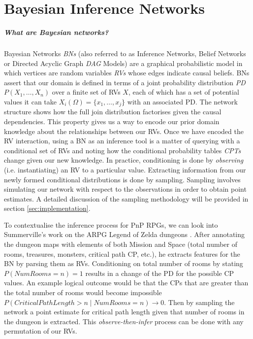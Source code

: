 \documentclass{UoYCSproject}
\begin{document}
\chapter{Bayesian Inference Networks}
\paragraph{What are Bayesian networks?}
Bayesian Networks \textit{BNs} \parencite{pearl1985bayesian} (also referred to as Inference Networks, Belief Networks or Directed Acyclic Graph \textit{DAG} Models) are a graphical probabilistic model in which vertices are random variables \textit{RVs} whose edges indicate causal beliefs. BNs assert that our domain is defined in terms of a joint probability distribution \textit{PD} \(P(X_1, \ldots , X_n)\) over a finite set of RVs \(X\), each of which has a set of potential values it can take \(X_i(\Omega) = \{x_1, \ldots, x_j\}\) with an associated PD. The network structure shows how the full join distribution factorises given the causal dependencies. This property gives us a way to encode our prior domain knowledge about the relationships between our RVs.
Once we have encoded the RV interaction, using a BN as an inference tool is a matter of querying with a conditional set of RVs and noting how the conditional probability tables \textit{CPTs} change given our new knowledge. In practice, conditioning is done by \textit{observing} (i.e. instantiating) an RV to a particular value. Extracting information from our newly formed conditional distributions is done by sampling. Sampling involves simulating our network with respect to the observations in order to obtain point estimates. A detailed discussion of the sampling methodology will be provided in section \ref{sec:implementation}.

To contextualise the inference process for PnP RPGs, we can look into Summerville's work on the ARPG Legend of Zelda dungeons \parencite{SummervilleLearningOfZelda}. After annotating the dungeon maps with elements of both Mission and Space (total number of rooms, treasures, monsters, critical path CP, etc.), he extracts features for the BN by parsing them as RVs. Conditioning on total number of rooms by stating \(P(NumRooms = n) = 1\) results in a change of the PD for the possible CP values. An example logical outcome would be that the CPs that are greater than the total number of rooms would become impossible \(P(CriticalPathLength > n \mid NumRooms = n) \rightarrow 0 \). Then by sampling the network a point estimate for critical path length given that number of rooms in the dungeon is extracted. This \textit{observe-then-infer} process can be done with any permutation of our RVs.
\end{document}
